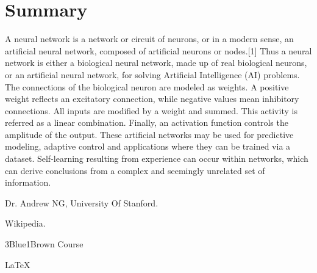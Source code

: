 \documentclass[12pt , a4paper]{article}
\begin{document}
\section{Summary}
A neural network is a network or circuit of neurons, or in a modern sense, an artificial neural network, composed of artificial neurons or nodes.[1] Thus a neural network is either a biological neural network, made up of real biological neurons, or an artificial neural network, for solving Artificial Intelligence (AI) problems. The connections of the biological neuron are modeled as weights. A positive weight reflects an excitatory connection, while negative values mean inhibitory connections. All inputs are modified by a weight and summed. This activity is referred as a linear combination. Finally, an activation function controls the amplitude of the output. These artificial networks may be used for predictive modeling, adaptive control and applications where they can be trained via a dataset. Self-learning resulting from experience can occur within networks, which can derive conclusions from a complex and seemingly unrelated set of information.
\newpage

\begin{thebibliography}{9}
Dr. Andrew NG, University Of Stanford. 

 
Wikipedia.

 
3Blue1Brown Course 

\end{thebibliography}











\LaTeX
\end{document}
